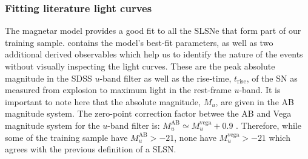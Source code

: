 \subsubsection{Fitting literature light curves}
The magnetar model provides a good fit to all the SLSNe that form part of our training sample.  contains the model's best-fit parameters, as well as two additional derived observables which help us to identify the nature of the events without visually inspecting the light curves. These are the peak absolute magnitude in the SDSS $u$-band filter as well as the rise-time, $t_\mathrm{rise}$, of the SN as measured from explosion to maximum light in the rest-frame $u$-band. It is important to note here that the absolute magnitude, $M_u$, are given in the AB magnitude system. The zero-point correction factor betwee the AB and Vega magnitude system for the $u$-band filter is: $M_u^{\mathrm{AB}}\simeq M_u^{\mathrm{vega}}+0.9$ \citep{2007AJ....133..734B}. Therefore, while some of the training sample have $M_u^{\mathrm{AB}}>-21$, none have $M_u^{\mathrm{vega}}>-21$ which agrees with the previous definition of a SLSN.

